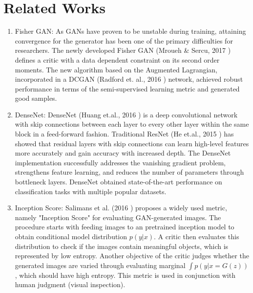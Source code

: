 \documentclass{article}
\begin{document}
\section{Related Works}
\label{sec:RW}

\begin{enumerate}
    \item
    Fisher GAN:
    As GANs have proven to be unstable during training, attaining convergence for the generator has been one of the primary difficulties for researchers. The newly developed Fisher GAN (Mroueh \& Sercu, 2017 \cite{DBLP:journals/corr/MrouehS17}) defines a critic with a data dependent constraint on its second order moments. The new algorithm based on the Augmented Lagrangian, incorporated in a DCGAN (Radford et. al., 2016 \cite{DBLP:journals/corr/RadfordMC15}) network, achieved robust performance in terms of the semi-supervised learning metric and generated good samples.


    \item
    DenseNet:
    DenseNet (Huang et.al., 2016 \cite{DBLP:journals/corr/HuangLW16}) is a deep convolutional network with skip connections between each layer to every other layer within the same block in a feed-forward fashion. Traditional ResNet (He et.al., 2015 \cite{DBLP:journals/corr/HeZRS15}) has showed that residual layers with skip connections can learn high-level features more accurately and gain accuracy with increased depth. The DenseNet implementation successfully addresses the vanishing gradient problem, strengthens feature learning, and reduces the number of parameters through bottleneck layers. DenseNet obtained state-of-the-art performance on classification tasks with multiple popular datasets.

    \item
    Inception Score:
    Salimans et al. (2016 \cite{DBLP:journals/corr/SalimansGZCRC16}) proposes a widely used metric, namely "Inception Score" for evaluating GAN-generated images. The procedure starts with feeding images to an pretrained inception model to obtain conditional model distribution $p(y|x)$. A critic then evaluates this distribution to check if the images contain meaningful objects, which is represented by low entropy. Another objective of the critic judges whether the generated images are varied through evaluating marginal $\int p(y|x = G(z))$, which should have high entropy. This metric is used in conjunction with human judgment (visual inspection).

\end{enumerate}
\end{document}
